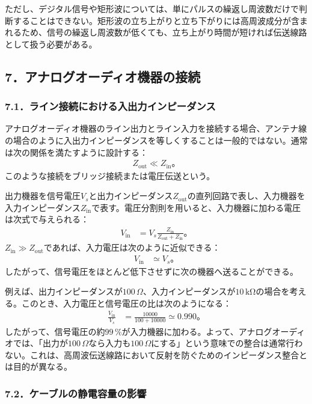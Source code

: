 \documentclass[platex,dvipdfmx,a4paper]{jsarticle}
\begin{document}
ただし、デジタル信号や矩形波については、単にパルスの繰返し周波数だけで判断することはできない。矩形波の立ち上がりと立ち下がりには高周波成分が含まれるため、信号の繰返し周波数が低くても、立ち上がり時間が短ければ伝送線路として扱う必要がある。

\subsection*{7．アナログオーディオ機器の接続}

\subsubsection*{7.1．ライン接続における入出力インピーダンス}

アナログオーディオ機器のライン出力とライン入力を接続する場合、アンテナ線の場合のように入出力インピーダンスを等しくすることは一般的ではない。通常は次の関係を満たすように設計する：
\begin{align*}
  Z_{\mathrm{out}}\ll Z_{\mathrm{in}}。
\end{align*}
このような接続をブリッジ接続または電圧伝送という。

出力機器を信号電圧$V_s$と出力インピーダンス$Z_{\mathrm{out}}$の直列回路で表し、入力機器を入力インピーダンス$Z_{\mathrm{in}}$で表す。電圧分割則を用いると、入力機器に加わる電圧は次式で与えられる：
\begin{align*}
  V_{\mathrm{in}}
  &=V_s\frac{Z_{\mathrm{in}}}{Z_{\mathrm{out}}+Z_{\mathrm{in}}}。
\end{align*}
$Z_{\mathrm{in}}\gg Z_{\mathrm{out}}$であれば、入力電圧は次のように近似できる：
\begin{align*}
  V_{\mathrm{in}}
  &\simeq V_s。
\end{align*}
したがって、信号電圧をほとんど低下させずに次の機器へ送ることができる。

例えば、出力インピーダンスが$100\,\Omega$、入力インピーダンスが$10\,\mathrm{k\Omega}$の場合を考える。このとき、入力電圧と信号電圧の比は次のようになる：
\begin{align*}
  \frac{V_{\mathrm{in}}}{V_s}
  &=\frac{10000}{100+10000}
   \simeq0.990。
\end{align*}
したがって、信号電圧の約$99\,\%$が入力機器に加わる。よって、アナログオーディオでは、「出力が$100\,\Omega$なら入力も$100\,\Omega$にする」という意味での整合は通常行わない。これは、高周波伝送線路において反射を防ぐためのインピーダンス整合とは目的が異なる。

\subsubsection*{7.2．ケーブルの静電容量の影響}
\end{document}
